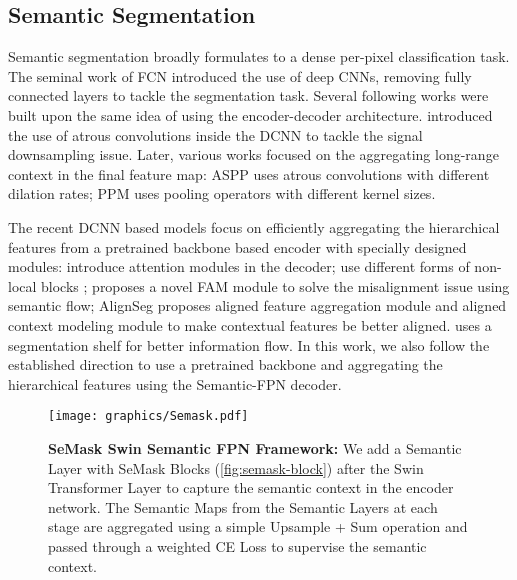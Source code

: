\documentclass[10pt,twocolumn,letterpaper]{article}
\newcommand{\vspaceunderfig}{\vspace{-0.2cm}}
\begin{document}
\subsection{Semantic Segmentation}
Semantic segmentation broadly formulates to a dense per-pixel classification task. The seminal work of FCN \cite{fcn} introduced the use of deep CNNs, removing fully connected layers to tackle the segmentation task. Several following works \cite{segnet, unet, refinenet} were built upon the same idea of using the encoder-decoder architecture. \cite{deeplabv1} introduced the use of atrous convolutions inside the DCNN to tackle the signal downsampling issue. Later, various works focused on the aggregating long-range context in the final feature map: ASPP \cite{deeplabv2, deeplabv3, deeplabv3+} uses atrous convolutions with different dilation rates; PPM \cite{pspnet} uses pooling operators with different kernel sizes.

The recent DCNN based models focus on efficiently aggregating the hierarchical features from a pretrained backbone based encoder with specially designed modules: \cite{attanet, lednet, hrnet-ocr} introduce attention modules in the decoder; \cite{ccnet, dualnet} use different forms of non-local blocks \cite{nonlocal}; \cite{sfnet} proposes a novel FAM module to solve the misalignment issue using semantic flow; AlignSeg \cite{Alignseg} proposes aligned feature aggregation module and aligned context modeling module to make contextual features be better aligned. \cite{shelfnet} uses a segmentation shelf for better information flow. In this work, we also follow the established direction to use a pretrained backbone and aggregating the hierarchical features \cite{swin-T} using the Semantic-FPN \cite{sem-fpn} decoder.

\begin{figure*}[ht!]
    \centering
    \texttt{[image: graphics/Semask.pdf]}
    \vspaceunderfig
    \vspace{-.35cm}
    \caption{\textbf{SeMask Swin Semantic FPN Framework:} 
    We add a Semantic Layer with  SeMask Blocks (\cref{fig:semask-block}) after the Swin Transformer Layer to capture the semantic context in the encoder network. The Semantic Maps from the Semantic Layers at each stage are aggregated using a simple Upsample + Sum operation and passed through a weighted CE Loss to supervise the semantic context.
        }
    \label{fig:semask}
\end{figure*}
\end{document}
